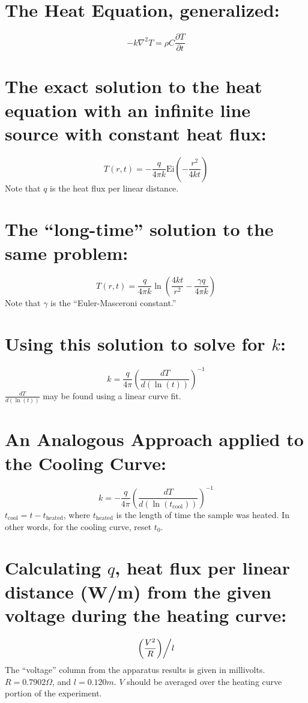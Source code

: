 \documentclass[letterpaper]{article}
\begin{document}
\section{The Heat Equation, generalized:}
\begin{equation}
-k\nabla^2T = \rho C \frac{\partial T}{\partial t}
\end{equation}

\section{The exact solution to the heat equation with an infinite line source with
constant heat flux:}
\begin{equation}
T(r, t) = -\frac{q}{4\pi k} \textrm{Ei}\left( -\frac{r^2}{4kt} \right)
\end{equation}
Note that \(q\) is the heat flux per linear distance.

\section{The ``long-time'' solution to the same problem:}
\begin{equation}
T(r,t) = \frac{q}{4\pi k}\ln\left( \frac{4kt}{r^2} - \frac{\gamma q}{4\pi k} \right)
\end{equation}
Note that \(\gamma\) is the ``Euler-Masceroni constant.''

\section{Using this solution to solve for \(k\):}
\begin{equation}
k = \frac{q}{4\pi} \left( \frac{dT}{d\left(\ln( t)\right)} \right)^{-1}
\end{equation}
\(\frac{dT}{d\left(\ln( t)\right)}\) may be found using a linear curve fit.

\section{An Analogous Approach applied to the Cooling Curve:}
\begin{equation}
k = -\frac{q}{4\pi} \left( \frac{dT}{d\left(\ln( t_{\textrm{cool}})\right)} \right)^{-1}
\end{equation}
\(t_{\textrm{cool}} = t - t_{\textrm{heated}}\), where \(t_{\textrm{heated}}\)
is the length of time the sample was heated. In other words, for the cooling
curve, reset \(t_0\).

\section{Calculating \(q\), heat flux per linear distance (W/m) from the
given voltage during the heating curve:}
\begin{equation}
\left. \left(\frac{V^2}{R}\right) \middle/ l \right.
\end{equation}
The ``voltage'' column from the apparatus results is given in millivolts. 
\(R = 0.7902 \Omega\), and \(l = 0.120 m\). \(V\) should be averaged over the
heating curve portion of the experiment.
\end{document}
